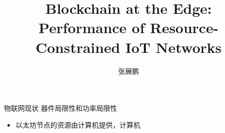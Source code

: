 \documentclass{beamer}
\title{Blockchain at the Edge: Performance of Resource-Constrained IoT Networks}
\author{张展鹏}
\begin{document}
\begin{frame}[plain]
    \maketitle
\end{frame}

\begin{frame}{物联网现状}
	器件局限性和功率局限性
	\begin{itemize}
		\item 以太坊节点的资源由计算机提供，计算机
	\end{itemize}
\end{frame}
\end{document}
